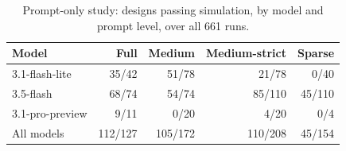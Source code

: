 \begin{table}[ht]
\centering
\caption{Prompt-only study: designs passing simulation, by model and prompt level, over all 661 runs. }
\label{tab:phase1grid}
\begin{tabular}{@{}lrrrr@{}}
\toprule
Model & Full & Medium & Medium-strict & Sparse \\
\midrule
3.1-flash-lite & 35/42 & 51/78 & 21/78 & 0/40 \\
3.5-flash & 68/74 & 54/74 & 85/110 & 45/110 \\
3.1-pro-preview & 9/11 & 0/20 & 4/20 & 0/4 \\
\midrule
All models & 112/127 & 105/172 & 110/208 & 45/154 \\
\bottomrule
\end{tabular}
\end{table}

